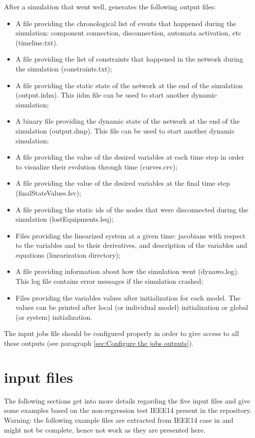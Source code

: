 \documentclass[a4paper, 12pt]{report}
\begin{document}
After a simulation that went well, \Dynawo generates the following output files:
\begin{itemize}
\item A file providing the chronological list of events that happened during the simulation: component connection, disconnection, automata activation, etc (timeline.txt).
\item A file providing the list of constraints that happened in the network during the simulation (constraints.txt);
\item A file providing the static state of the network at the end of the simulation (output.iidm). This iidm file can be used to start another dynamic simulation;
\item A binary file providing the dynamic state of the network at the end of the simulation (output.dmp). This file can be used to start another dynamic simulation;
\item A file providing the value of the desired variables at each time step in order to visualize their evolution through time (curves.crv);
\item A file providing the value of the desired variables at the final time step (finalStateValues.fsv);
\item A file providing the static ids of the nodes that were disconnected during the simulation (lostEquipments.leq);
\item Files providing the linearized system at a given time: jacobians with respect to the variables and to their derivatives, and description of the variables and equations (linearization directory);
\item A file providing information about how the simulation went (dynawo.log). This log file contains error messages if the simulation crashed;
\item Files providing the variables values after initialization for each model. The values can be printed after local (or individual model) initialization or global (or system) initialization.
\end{itemize}

The input jobs file should be configured properly in order to give access to all these outputs (see paragraph \ref{sec:Configure the jobs outputs}).

\section[Dynawo input files]{\Dynawo input files}

The following sections get into more details regarding the five input files and give some examples based on the non-regression test IEEE14 present in the \Dynawo repository. \\
Warning: the following example files are extracted from IEEE14 case in \Dynawo and might not be complete, hence not work as they are presented here.
\end{document}
